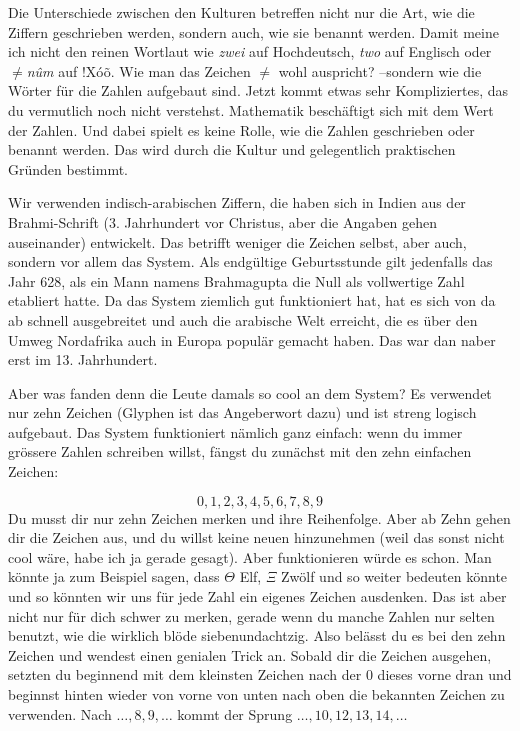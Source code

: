 Die Unterschiede zwischen den Kulturen betreffen nicht nur die Art, wie die Ziffern geschrieben werden, sondern auch, wie sie benannt werden. Damit meine ich nicht den reinen Wortlaut wie \textit{zwei} auf Hochdeutsch, \textit{two} auf Englisch oder \textit{$\neq$n\^{u}m} auf $!$X\'{o}\~{o}. Wie man das Zeichen $\neq$ wohl auspricht? --sondern wie die Wörter für die Zahlen aufgebaut sind. Jetzt kommt etwas sehr Kompliziertes, das du vermutlich noch nicht verstehst. Mathematik beschäftigt sich mit dem Wert der Zahlen. Und dabei spielt es keine Rolle, wie die Zahlen geschrieben oder benannt werden. Das wird durch die Kultur und gelegentlich praktischen Gründen bestimmt.

Wir verwenden indisch-arabischen Ziffern, die haben sich in Indien aus der Brahmi-Schrift (3. Jahrhundert vor Christus, aber die Angaben gehen auseinander) entwickelt. Das betrifft weniger die Zeichen selbst, aber auch, sondern vor allem das System. Als endgültige Geburtsstunde gilt jedenfalls das Jahr 628, als ein Mann namens Brahmagupta die Null als vollwertige Zahl etabliert hatte. Da das System ziemlich gut funktioniert hat, hat es sich von da ab schnell ausgebreitet und auch die arabische Welt erreicht, die es über den Umweg Nordafrika auch in Europa populär gemacht haben. Das war dan naber erst im 13. Jahrhundert.

Aber was fanden denn die Leute damals so cool an dem System? Es verwendet nur zehn Zeichen (Glyphen ist das Angeberwort dazu) und ist streng logisch aufgebaut. Das System funktioniert nämlich ganz einfach: wenn du immer grössere Zahlen schreiben willst, fängst du zunächst mit den zehn einfachen Zeichen:

$$0, 1, 2, 3, 4, 5, 6, 7, 8, 9$$
Du musst dir nur zehn Zeichen merken und ihre Reihenfolge. Aber ab Zehn gehen dir die Zeichen aus, und du willst keine neuen hinzunehmen (weil das sonst nicht cool wäre, habe ich ja gerade gesagt). Aber funktionieren würde es schon. Man könnte ja zum Beispiel sagen, dass $\Theta$ Elf, $\Xi$ Zwölf und so weiter bedeuten könnte und so könnten wir uns für jede Zahl ein eigenes Zeichen ausdenken. Das ist aber nicht nur für dich schwer zu merken, gerade wenn du manche Zahlen nur selten benutzt, wie die wirklich blöde siebenundachtzig. Also belässt du es bei den zehn Zeichen und wendest einen genialen Trick an. Sobald dir die Zeichen ausgehen, setzten du beginnend mit dem kleinsten Zeichen nach der 0 dieses vorne dran und beginnst hinten wieder von vorne von unten nach oben die bekannten Zeichen zu verwenden. Nach $\dots, 8, 9,\dots$ kommt der Sprung $\dots, 10, 12, 13, 14,\dots$


